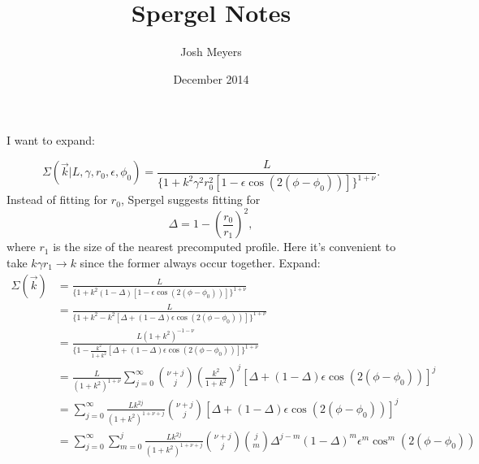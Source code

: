 \documentclass{article}
\title{Spergel Notes}
\author{Josh Meyers}
\date{December 2014}
\begin{document}
I want to expand:

\begin{equation}
  \Sigma(\vec{k}|L,\gamma,r_0,\epsilon,\phi_0) = \frac{L}{\{1+k^2\gamma^2r_0^2[1-\epsilon\cos(2(\phi-\phi_0))]\}^{1+\nu}}.
\end{equation}
Instead of fitting for $r_0$, Spergel suggests fitting for
\begin{equation}
  \Delta = 1 - \left(\frac{r_0}{r_1}\right)^2,
\end{equation}
where $r_1$ is the size of the nearest precomputed profile.  Here it's convenient to take $k \gamma r_1 \rightarrow k$ since the former always occur together.
Expand:
\begin{equation}
  \begin{split}
    \Sigma(\vec{k}) & = \frac{L}{\{1+k^2(1-\Delta)[1-\epsilon\cos(2(\phi-\phi_0))]\}^{1+\nu}} \\
    & = \frac{L}{\{1+k^2 - k^2[\Delta + (1-\Delta)\epsilon\cos(2(\phi-\phi_0))]\}^{1+\nu}} \\
    & = \frac{L (1+k^2)^{-1-\nu}}{\{1 - \frac{k^2}{1+k^2}\left[\Delta + (1-\Delta)\epsilon\cos(2(\phi-\phi_0))\right]\}^{1+\nu}} \\
    & = \frac{L}{(1+k^2)^{1+\nu}}\sum_{j=0}^{\infty}\binom{\nu+j}{j}\left(\frac{k^2}{1+k^2}\right)^{j}[\Delta + (1-\Delta)\epsilon\cos(2(\phi-\phi_0))]^j \\
    & = \sum_{j=0}^{\infty}\frac{L k^{2j}}{(1+k^2)^{1+\nu+j}}\binom{\nu+j}{j}[\Delta + (1-\Delta)\epsilon\cos(2(\phi-\phi_0))]^j \\
    & = \sum_{j=0}^{\infty}\sum_{m=0}^{j}\frac{L k^{2j}}{(1+k^2)^{1+\nu+j}}\binom{\nu+j}{j}\binom{j}{m}\Delta^{j-m}(1-\Delta)^m\epsilon^m\cos^m(2(\phi-\phi_0))
  \end{split}
\end{equation}
\end{document}
